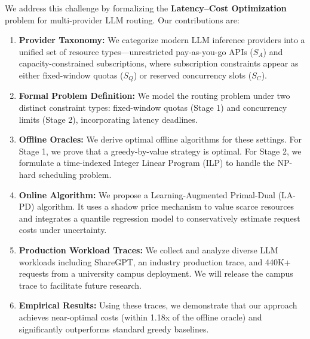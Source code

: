 We address this challenge by formalizing the \textbf{Latency--Cost Optimization} problem for multi-provider LLM routing. Our contributions are:

\begin{enumerate}
    \item \textbf{Provider Taxonomy:} We categorize modern LLM inference providers into a unified set of resource types---unrestricted pay-as-you-go APIs ($S_A$) and capacity-constrained subscriptions, where subscription constraints appear as either fixed-window quotas ($S_Q$) or reserved concurrency slots ($S_C$).
    \item \textbf{Formal Problem Definition:} We model the routing problem under two distinct constraint types: fixed-window quotas (Stage 1) and concurrency limits (Stage 2), incorporating latency deadlines.
    \item \textbf{Offline Oracles:} We derive optimal offline algorithms for these settings. For Stage 1, we prove that a greedy-by-value strategy is optimal. For Stage 2, we formulate a time-indexed Integer Linear Program (ILP) to handle the NP-hard scheduling problem.
    \item \textbf{Online Algorithm:} We propose a Learning-Augmented Primal-Dual (LA-PD) algorithm. It uses a shadow price mechanism to value scarce resources and integrates a quantile regression model to conservatively estimate request costs under uncertainty.
    \item \textbf{Production Workload Traces:} We collect and analyze diverse LLM workloads including ShareGPT, an industry production trace, and 440K+ requests from a university campus deployment. We will release the campus trace to facilitate future research.
    \item \textbf{Empirical Results:} Using these traces, we demonstrate that our approach achieves near-optimal costs (within 1.18x of the offline oracle) and significantly outperforms standard greedy baselines.
\end{enumerate}
